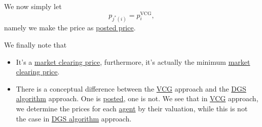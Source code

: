 We now simply let
\[
	p_{j^{\ast} (i)} = p_{i}^\mathrm{VCG},
\]
namely we make the price as \hyperref[rmk:posted]{posted price}.

\begin{remark}
	We finally note that
	\begin{itemize}
		\item It's a \hyperref[note:market-clearing-prices]{market clearing price}, furthermore, it's actually the minimum
		      \hyperref[note:market-clearing-prices]{market clearing price}.
		\item There is a conceptual difference between the \hyperref[thm:VCG]{VCG} approach and the \hyperref[algo:Demange-Gale-Sotomayor-algorithm]{DGS algorithm}
		      approach. One is \hyperref[rmk:posted]{posted}, one is not. We see that in \hyperref[thm:VCG]{VCG} approach, we determine
		      the prices for each \hyperref[def:player]{agent} by their valuation, while this is not the case in
		      \hyperref[algo:Demange-Gale-Sotomayor-algorithm]{DGS algorithm} approach.
	\end{itemize}
\end{remark}